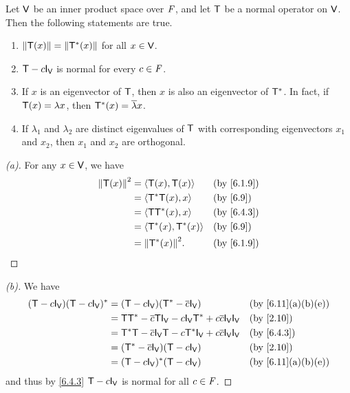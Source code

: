 \begin{thm}\label{6.15}
  Let \(\mathsf{V}\) be an inner product space over \(\mathit{F}\), and let \(\mathsf{T}\) be a normal operator on \(\mathsf{V}\).
  Then the following statements are true.
  \begin{enumerate}
    \item \(\left\lVert\mathsf{T}(x)\right\rVert = \left\lVert\mathsf{T}^*(x)\right\rVert\) for all \(x \in \mathsf{V}\).
    \item \(\T - c \IT[\V]\) is normal for every \(c \in \mathit{F}\).
    \item If \(x\) is an eigenvector of \(\mathsf{T}\), then \(x\) is also an eigenvector of \(\mathsf{T}^*\).
          In fact, if \(\mathsf{T}(x) = \lambda x\), then \(\mathsf{T}^*(x) = \overline{\lambda} x\).
    \item If \(\lambda_1\) and \(\lambda_2\) are distinct eigenvalues of \(\mathsf{T}\) with corresponding eigenvectors \(x_1\) and \(x_2\), then \(x_1\) and \(x_2\) are orthogonal.
  \end{enumerate}
\end{thm}

\begin{proof}[(a)]
  For any \(x \in \mathsf{V}\), we have
  \begin{align*}
    \norm{\T(x)}^2 & = \inn{\T(x), \T(x)}     &  & \text{(by \cref{6.1.9})} \\
                   & = \inn{\T^* \T(x), x}    &  & \text{(by \cref{6.9})}   \\
                   & = \inn{\T \T^*(x), x}    &  & \text{(by \cref{6.4.3})} \\
                   & = \inn{\T^*(x), \T^*(x)} &  & \text{(by \cref{6.9})}   \\
                   & = \norm{\T^*(x)}^2.      &  & \text{(by \cref{6.1.9})}
  \end{align*}
\end{proof}

\begin{proof}[(b)]
  We have
  \begin{align*}
    (\T - c \IT[\V]) (\T - c \IT[\V])^* & = (\T - c \IT[\V]) (\T^* - \conj{c} \IT[\V])                                  &  & \text{(by \cref{6.11}(a)(b)(e))} \\
                                        & = \T \T^* - \conj{c} \T \IT[\V] - c \IT[\V] \T^* + c \conj{c} \IT[\V] \IT[\V] &  & \text{(by \cref{2.10})}          \\
                                        & = \T^* \T - \conj{c} \IT[\V] \T - c \T^* \IT[\V] + c \conj{c} \IT[\V] \IT[\V] &  & \text{(by \cref{6.4.3})}         \\
                                        & = (\T^* - \conj{c} \IT[\V]) (\T - c \IT[\V])                                  &  & \text{(by \cref{2.10})}          \\
                                        & = (\T - c \IT[\V])^* (\T - c \IT[\V])                                         &  & \text{(by \cref{6.11}(a)(b)(e))}
  \end{align*}
  and thus by \cref{6.4.3} \(\T - c \IT[\V]\) is normal for all \(c \in \mathit{F}\).
\end{proof}

